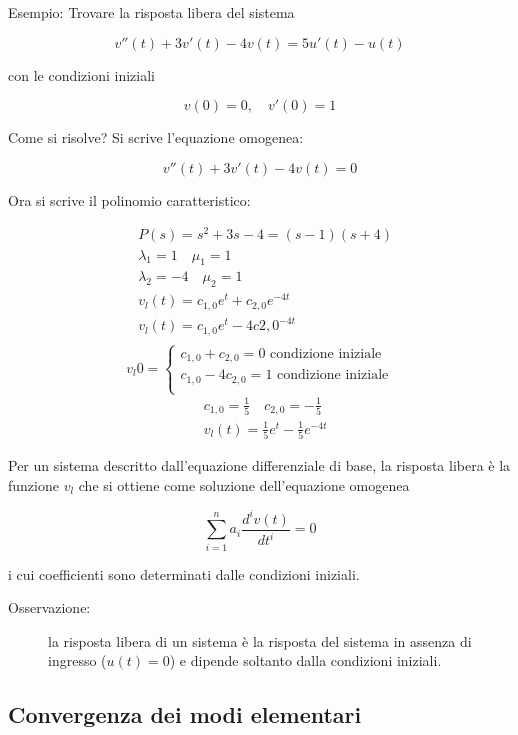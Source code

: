 \documentclass[a4paper, 12pt]{book}
\theoremstyle{plain}
\begin{document}
Esempio: Trovare la risposta libera del sistema

\[
    v''(t) + 3v'(t) - 4v(t) = 5u'(t) - u(t)
\]

con le condizioni iniziali

\[
    v(0) = 0, \quad v'(0) = 1
\]

Come si risolve? Si scrive l'equazione omogenea:

\[
    v''(t) + 3v'(t) - 4v(t) = 0
\]

Ora si scrive il polinomio caratteristico:

\[
    \begin{split}
        &P(s) = s^2 + 3s - 4 = (s - 1)(s + 4) \\
        &\lambda_1 = 1 \quad \mu_1 = 1 \\
        &\lambda_2 = -4 \quad \mu_2 = 1 \\
        &v_l(t) = c_{1,0} e^t + c_{2,0} e^{-4t} \\
        &v_l(t) = c_{1,0} e^t - 4c{2,0}^{-4t} \\
    \end{split}
\]
\[
v_l{0} =
    \begin{cases}
        c_{1,0} + c_{2,0} = 0 \textrm{ condizione iniziale} \\
        c_{1,0} - 4c_{2,0} = 1 \textrm{ condizione iniziale} \\
    \end{cases}
\]
\[
    \begin{split}
        &c_{1,0} = \frac{1}{5} \quad c_{2,0} = -\frac{1}{5} \\
        &v_l(t) = \frac{1}{5} e^t - \frac{1}{5} e^{-4t}
    \end{split}
\]

Per un sistema descritto dall'equazione differenziale di base, la risposta libera è la funzione $v_l$ che si ottiene come 
soluzione dell'equazione omogenea 

\[
    \sum_{i = 1}^n a_i \frac{d^iv(t)}{dt^i} = 0
\]

i cui coefficienti sono determinati dalle condizioni iniziali.

\begin{description}
    \item[Osservazione:] la risposta libera di un sistema è la risposta del sistema in assenza di ingresso ($u(t) = 0$) e dipende soltanto dalla condizioni iniziali.
\end{description}

\subsection{Convergenza dei modi elementari}
\end{document}
